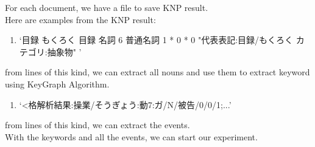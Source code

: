 For each document, we have a file to save KNP result.\\
Here are examples from the KNP result:\\
\begin{enumerate}[*]
\item \begin{CJK}{UTF8}{ipxm}
`目録 もくろく 目録 名詞 6 普通名詞 1 * 0 * 0 "代表表記:目録/もくろく カテゴリ:抽象物" '
\end{CJK}
\end{enumerate}
from lines of this kind, we can extract all nouns and use them to extract keyword using KeyGraph Algorithm.\\
\begin{enumerate}[*]
\item \begin{CJK}{UTF8}{ipxm}
`<格解析結果:操業/そうぎょう:動7:ガ/N/被告/0/0/1;...'
\end{CJK}
\end{enumerate}
from lines of this kind, we can extract the events.\\
With the keywords and all the events, we can start our experiment.\\